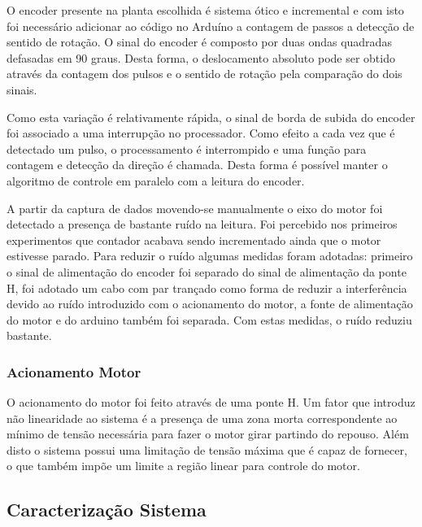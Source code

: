 \documentclass[a4paper,11pt]{article}
\begin{document}
O encoder presente na planta escolhida é sistema ótico e incremental e com isto foi necessário adicionar ao código no Arduíno a contagem de passos a detecção de sentido de rotação. O sinal do encoder é composto por duas ondas quadradas defasadas em 90 graus. Desta forma, o deslocamento absoluto pode ser obtido através da contagem dos pulsos e o sentido de rotação pela comparação do dois sinais.


Como esta variação é relativamente rápida, o sinal de borda de subida do encoder foi associado a uma interrupção no processador. Como efeito a cada vez que é detectado um pulso, o processamento é interrompido e uma função para contagem e detecção da direção é chamada. Desta forma é possível manter o algoritmo de controle em paralelo com a leitura do encoder.

A partir da captura de dados movendo-se manualmente o eixo do motor foi detectado a presença de bastante ruído na leitura. Foi percebido nos primeiros experimentos que contador acabava sendo incrementado ainda que o motor estivesse parado. Para reduzir o ruído algumas medidas foram adotadas: primeiro o sinal de alimentação do encoder foi separado do sinal de alimentação da ponte H, foi adotado um cabo com par trançado como forma de reduzir a interferência devido ao ruído introduzido com o acionamento do motor, a fonte de alimentação do motor e do arduino também foi separada. Com estas medidas, o ruído reduziu bastante.

\subsubsection{Acionamento Motor}

O acionamento do motor foi feito através de uma ponte H. Um fator que introduz não linearidade ao sistema é a presença de uma zona morta correspondente ao mínimo de tensão necessária para fazer o motor girar partindo do repouso. Além disto o sistema possui uma limitação de tensão máxima que é capaz de fornecer, o que também impõe um limite a região linear para controle do motor.

\subsection{Caracterização Sistema}
\end{document}
